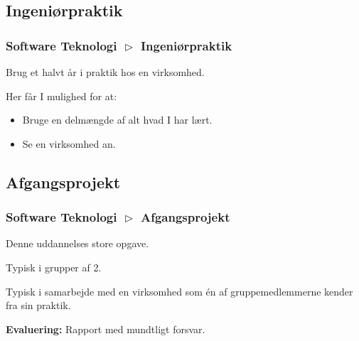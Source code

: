 \begin{frame}[fragile]
{
  }
\end{frame}

\subsection{Ingeniørpraktik}
\begin{frame}[fragile]
  \frametitle{Software Teknologi $\vartriangleright$ Ingeniørpraktik}
  \vspace{3mm}
  Brug et halvt år i praktik hos en virksomhed.
  
  \pause
  \vspace{5mm}
  Her får I mulighed for at:
  \begin{itemize}
    \item Bruge en delmængde af alt hvad I har lært.
    \item Se en virksomhed an.
  \end{itemize}
\end{frame}

\subsection{Afgangsprojekt}
\begin{frame}[fragile]
  \frametitle{Software Teknologi $\vartriangleright$ Afgangsprojekt}
  \vspace{3mm}
  Denne uddannelses store opgave.
  
  \pause
  \vspace{5mm}
  Typisk i grupper af 2.
  
  \pause
  \vspace{5mm}
  Typisk i samarbejde med en virksomhed som én af gruppemedlemmerne kender fra sin praktik.
  
  \pause
  \vspace{5mm}
  \textbf{Evaluering:} Rapport med mundtligt forsvar.
\end{frame}

